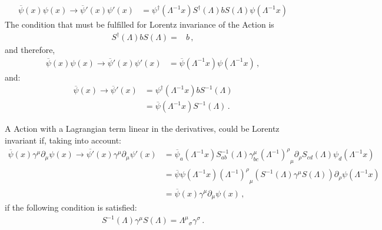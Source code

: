 \begin{align}
  \overline{\psi}(x)\psi(x)\to  \overline{\psi}'(x)\psi'(x)&=
\psi^\dagger\left(\Lambda^{-1}x\right)S^\dagger(\Lambda)b S(\Lambda)\psi\left(\Lambda^{-1}x\right)
\end{align}
The condition that must be fulfilled for Lorentz invariance of the Action is 
\begin{align}
  \label{eq:ltrinscal}
  S^\dagger(\Lambda)bS(\Lambda)=&b\,,
\end{align}
and therefore, 
\begin{align}
  \overline{\psi}(x)\psi(x)\to  \overline{\psi}'(x)\psi'(x)&=
\overline{\psi}\left(\Lambda^{-1}x\right)\psi\left(\Lambda^{-1}x\right)\,,
\end{align}
and:
\begin{align}
  \overline{\psi}(x)\to  \overline{\psi}'(x)&=
\psi^\dagger\left(\Lambda^{-1}x\right)b S^{-1}(\Lambda)\nonumber\\
&=\overline{\psi}\left(\Lambda^{-1}x\right)S^{-1}(\Lambda)\,.
\end{align}


A Action with a Lagrangian term linear in the derivatives, could be Lorentz invariant if, taking into account:
 \begin{align}
   \overline{\psi}(x)\gamma^\mu\partial_\mu\psi(x)\to  \overline{\psi'}(x)\gamma^\mu\partial_\mu\psi'(x)&=
 \overline{\psi}_a\left(\Lambda^{-1}x\right)S^{-1}_{ab}(\Lambda)\gamma^\mu_{bc}{\left(\Lambda^{-1}\right)^\rho}_\mu\partial_\rho S_{cd}(\Lambda)\psi_d\left(\Lambda^{-1}x\right)\nonumber\\
   &=
\overline{\psi} \psi\left(\Lambda^{-1}x\right){\left(\Lambda^{-1}\right)^\rho}_\mu \left(S^{-1}(\Lambda)\gamma^\mu S(\Lambda)\right)\partial_\rho\psi\left(\Lambda^{-1}x\right)\nonumber\\
&=\overline{\psi}(x)\gamma^\mu\partial_\mu\psi(x)\,,
 \end{align}
if the following condition is satisfied:
\begin{align}
\label{eq:ltrincond}
  S^{-1}(\Lambda)\gamma^\mu S(\Lambda)={\Lambda^\mu}_\sigma\gamma^\sigma\,.
\end{align}




